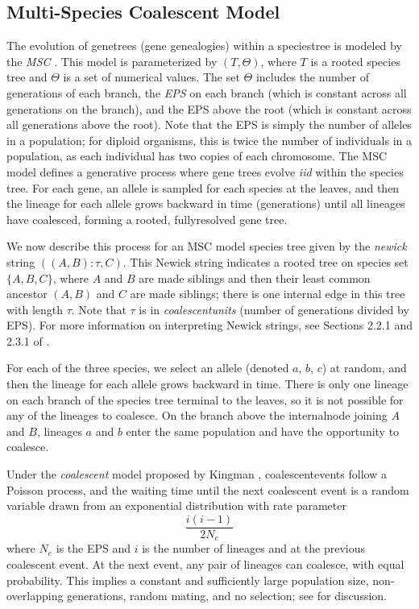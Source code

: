 \subsection{Multi-Species Coalescent Model}
\label{sec:background-msc}
The evolution of \glspl{genetree} (gene genealogies) within a \gls{speciestree} is modeled by the \textit{\gls{MSC}} \cite{tajima1983evolutionary, pamilo1988relationships, rosenberg2002probability, rannala2003bayes}.
This model is parameterized by $(T, \Theta)$, where $T$ is a \gls{rooted} species tree and $\Theta$ is a set of numerical values.
The set $\Theta$ includes the number of generations of each branch, the \textit{\gls{EPS}} on each branch (which is constant across all generations on the branch), and the EPS above the root (which is constant across all generations above the root).
Note that the EPS is simply the number of alleles in a population; for diploid organisms, this is twice the number of individuals in a population, as each individual has two copies of each chromosome.
The MSC model defines a generative process where gene trees evolve \textit{\gls{iid}} within the species tree. 
For each gene, an \gls{allele} is sampled for each species at the leaves, and then the \gls{lineage} for each allele grows backward in time (generations) until all lineages  have coalesced, forming a rooted, \gls{fullyresolved} gene tree.

We now describe this process for an MSC model species tree given by the \textit{\gls{newick}} string $((A,B):\tau,C)$.
This Newick string indicates a rooted tree on species set $\{A, B, C\}$, where $A$ and $B$ are made siblings and then their least common ancestor $(A,B)$ and $C$ are made siblings; there is one internal edge in this tree with length $\tau$.
Note that $\tau$ is in \textit{\glspl{coalescentunit}} (number of generations divided by EPS).
For more information on interpreting Newick strings, see Sections 2.2.1 and 2.3.1 of \cite{warnow2017computational}.

For each of the three species, we select an allele (denoted $a$, $b$, $c$) at random, and then the lineage for each allele grows backward in time.
There is only one lineage on each branch of the species tree terminal to the leaves, so it is not possible for any of the lineages to \gls{coalesce}.
On the branch above the \gls{internalnode} joining $A$ and $B$, lineages $a$ and $b$ enter the same population and have the opportunity to coalesce.

Under the \textit{\Gls{coalescent}} model proposed by Kingman \cite{kingman1982on}, \glspl{coalescentevent} follow a Poisson process, and the waiting time until the next coalescent event is a random variable drawn from an exponential distribution with rate parameter
\begin{equation}
	\frac{i (i-1)}{2 N_e}
\end{equation}
where $N_e$ is the EPS and $i$ is the number of lineages and  at the previous coalescent event.
At the next event, any pair of lineages can coalesce, with equal probability.
This implies a constant and sufficiently large population size, non-overlapping generations, random mating, and no selection; see \cite{wakley2009coalescent} for discussion.


